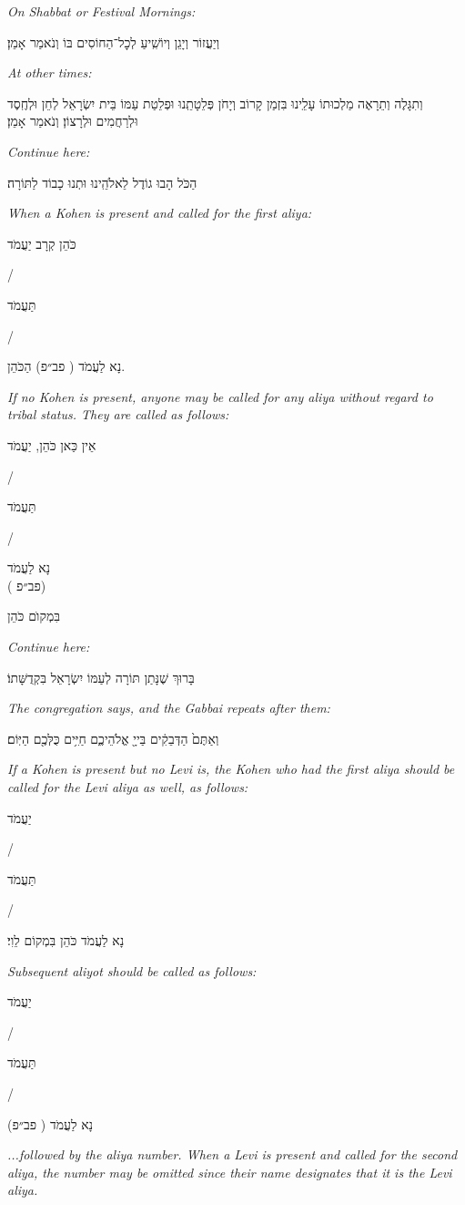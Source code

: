 \documentclass[letterpaper, 12pt]{article}
\newcommand{\englishinst}[1]{
	\begin{minipage}{\textwidth}
		\begin{english}\raggedright\centering
			\textit{#1}
				
				\vspace{2pt}
		\end{english}
	\end{minipage}
}
\newcommand{\rashi}[1]{%
		\textsf{#1}}
\newcommand{\eng}[1]{\begin{english}\beginL #1 \endL\end{english}}
\newcommand{\ploni}{(\rashi{פב״פ})
}
\begin{document}
\begin{large}\centering
	\englishinst{On Shabbat or Festival Mornings:}
	וְיַעֲזוֹר וְיָגֵן וְיוֹשִֽׁיעַ לְכׇל־הַחוֹסִים בּוֹ וְנֹאמַר אָמֵן׃\\
	
	 \englishinst{At other times:}
	וְתִגָּלֶה וְתֵרָאֶה מַלְכוּתוֹ עָלֵֽינוּ בִּזְמַן קָרוֹב וְיָחֹן פְּלֵטָתֵֽנוּ וּפְלֵטַת עַמּוֹ בֵּית יִשְׂרָאֵל לְחֵן וּלְחֶֽסֶד וּלְרַחֲמִים וּלְרָצוֹן׃ וְנֹאמַר אָמֵן׃\\

\englishinst{Continue here:}
הַכֹּל הָבוּ גוֹדֶל לֵאלֹהֵֽינוּ וּתְנוּ כָבוֹד לַתּוֹרָה׃\\

\vspace{6pt}\englishinst{When a Kohen is present and called for the first aliya:}
 כֹּהֵן קְרָב יַעֲמֹד \eng{/} תַּעֲמֹד \eng{/} נָא לַעֲמֹד \ploni הַכֹּהֵן.\\
\vspace{6pt}\englishinst{If no Kohen is present, anyone may be called for any aliya without regard to tribal status. They are called as follows:}
אֵין כַּאן כֹּהֵן, יַעֲמֹד \eng{/} תַּעֲמֹד \eng{/} נָא לַעֲמֹד\\
\ploni
בִּמְקוׂם כֹּהֵן\\

\vspace{6pt}\englishinst{Continue here:}
בָּרוּךְ שֶׁנָּתַן תּוֹרָה לְעַמּוֹ יִשְׂרָאֵל בִּקְדֻשָּׁתוֹ׃\\

\vspace{6pt}\englishinst{The congregation says, and the Gabbai repeats after them:}
וְאַתֶּם֙ הַדְּבֵקִ֔ים בַּייָ֖ אֱלֹהֵיכֶ֑ם חַיִּ֥ים כֻּלְּכֶ֖ם הַיּֽוֹם׃\\

\vspace{6pt}\englishinst{If a Kohen is present but no Levi is, the Kohen who had the first aliya should be called for the Levi aliya as well, as follows:}
יַעֲמֹד \eng{/} תַּעֲמֹד \eng{/} נָא לַעֲמֹד כֹּהֵן בִּמְקוֹם לֵוִי׃\\

\vspace{6pt}\englishinst{Subsequent aliyot should be called as follows:}
יַעֲמֹד \eng{/} תַּעֲמֹד \eng{/} נָא לַעֲמֹד \ploni \\
\englishinst{...followed by the aliya number. When a Levi is present and called for the second aliya, the number may be omitted since their name designates that it is the Levi aliya.}
\end{large}
\end{document}
